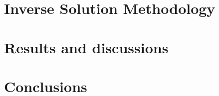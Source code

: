\documentclass[preprint,12pt]{elsarticle}
\begin{document}
\section{Inverse Solution Methodology}





\section{Results and discussions}


\section{Conclusions}

\appendix

{}

\end{document}
